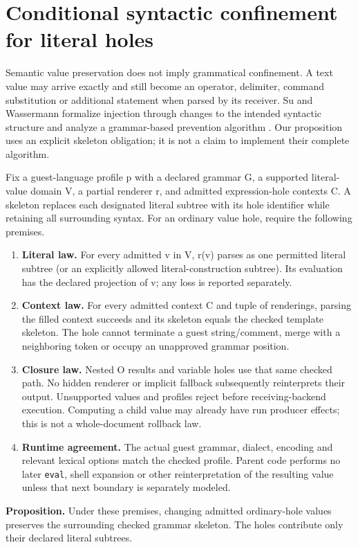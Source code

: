 \documentclass[11pt]{article}
\begin{document}
\clearpage

\section{Conditional syntactic confinement for literal holes}

Semantic value preservation does not imply grammatical confinement. A text value may arrive exactly and still become an operator, delimiter, command substitution or additional statement when parsed by its receiver. Su and Wassermann formalize injection through changes to the intended syntactic structure and analyze a grammar-based prevention algorithm \cite{su2006}. Our proposition uses an explicit skeleton obligation; it is not a claim to implement their complete algorithm.

Fix a guest-language profile p with a declared grammar G, a supported literal-value domain V, a partial renderer r, and admitted expression-hole contexts C. A skeleton replaces each designated literal subtree with its hole identifier while retaining all surrounding syntax. For an ordinary value hole, require the following premises.

\begin{enumerate}
\item \textbf{Literal law.} For every admitted v in V, r(v) parses as one permitted literal subtree (or an explicitly allowed literal-construction subtree). Its evaluation has the declared projection of v; any loss is reported separately.
\item \textbf{Context law.} For every admitted context C and tuple of renderings, parsing the filled context succeeds and its skeleton equals the checked template skeleton. The hole cannot terminate a guest string/comment, merge with a neighboring token or occupy an unapproved grammar position.
\item \textbf{Closure law.} Nested O results and variable holes use that same checked path. No hidden renderer or implicit fallback subsequently reinterprets their output. Unsupported values and profiles reject before receiving-backend execution. Computing a child value may already have run producer effects; this is not a whole-document rollback law.
\item \textbf{Runtime agreement.} The actual guest grammar, dialect, encoding and relevant lexical options match the checked profile. Parent code performs no later \texttt{eval}, shell expansion or other reinterpretation of the resulting value unless that next boundary is separately modeled.
\end{enumerate}
\textbf{Proposition.} Under these premises, changing admitted ordinary-hole values preserves the surrounding checked grammar skeleton. The holes contribute only their declared literal subtrees.
\end{document}
